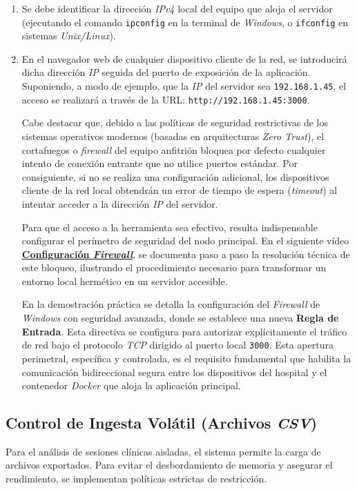 \begin{enumerate}
	\item Se debe identificar la dirección \textit{IPv4} local del equipo que aloja el servidor (ejecutando el comando \texttt{ipconfig} en la terminal de \textit{Windows}, o \texttt{ifconfig} en sistemas \textit{Unix/Linux}).
	
	\item En el navegador web de cualquier dispositivo cliente de la red, se introducirá dicha dirección \textit{IP} seguida del puerto de exposición de la aplicación. Suponiendo, a modo de ejemplo, que la \textit{IP} del servidor sea \texttt{192.168.1.45}, el acceso se realizará a través de la URL: \texttt{http://192.168.1.45:3000}.
	
Cabe destacar que, debido a las políticas de seguridad restrictivas de los sistemas operativos modernos (basadas en arquitecturas \textit{Zero Trust}), el cortafuegos o \textit{firewall} del equipo anfitrión bloquea por defecto cualquier intento de conexión entrante que no utilice puertos estándar. Por consiguiente, si no se realiza una configuración adicional, los dispositivos cliente de la red local obtendrán un error de tiempo de espera (\textit{timeout}) al intentar acceder a la dirección \textit{IP} del servidor.

Para que el acceso a la herramienta sea efectivo, resulta indispensable configurar el perímetro de seguridad del nodo principal. En el siguiente vídeo \textbf{\href{https://youtu.be/zeIvf4545cU}{Configuración \textit{Firewall}}}, se documenta paso a paso la resolución técnica de este bloqueo, ilustrando el procedimiento necesario para transformar un entorno local hermético en un servidor accesible.

En la demostración práctica se detalla la configuración del \textit{Firewall} de \textit{Windows} con seguridad avanzada, donde se establece una nueva \textbf{Regla de Entrada}. Esta directiva se configura para autorizar explícitamente el tráfico de red bajo el protocolo \textit{TCP} dirigido al puerto local \texttt{3000}. Esta apertura perimetral, específica y controlada, es el requisito fundamental que habilita la comunicación bidireccional segura entre los dispositivos del hospital y el contenedor \textit{Docker} que aloja la aplicación principal.	
\end{enumerate}


\subsection{Control de Ingesta Volátil (Archivos \textit{CSV})}
Para el análisis de sesiones clínicas aisladas, el sistema permite la carga de archivos exportados. Para evitar el desbordamiento de memoria y asegurar el rendimiento, se implementan políticas estrictas de restricción.

